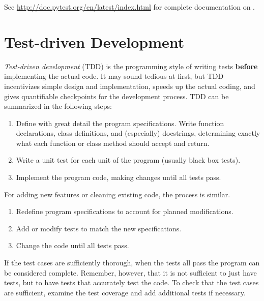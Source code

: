 See \url{http://doc.pytest.org/en/latest/index.html} for complete documentation on .

\section*{Test-driven Development} %

\emph{Test-driven development} (TDD) is the programming style of writing tests \textbf{before} implementing the actual code.
It may sound tedious at first, but TDD incentivizes simple design and implementation, speeds up the actual coding, and gives quantifiable checkpoints for the development process.
TDD can be summarized in the following steps:
\begin{enumerate}
\item Define with great detail the program specifications.
Write function declarations, class definitions, and (especially) docstrings, determining exactly what each function or class method should accept and return.
\item Write a unit test for each unit of the program (usually black box tests).
\item Implement the program code, making changes until all tests pass.
\end{enumerate}
For adding new features or cleaning existing code, the process is similar.
\begin{enumerate}
\item Redefine program specifications to account for planned modifications.
\item Add or modify tests to match the new specifications.
\item Change the code until all tests pass.
\end{enumerate}

\begin{center}
\end{center}

If the test cases are sufficiently thorough, when the tests all pass the program can be considered complete.
Remember, however, that it is not sufficient to just have tests, but to have tests that accurately test the code.
To check that the test cases are sufficient, examine the test coverage and add additional tests if necessary.

